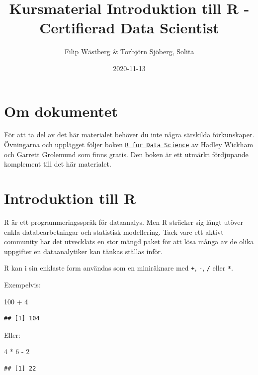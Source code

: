 \documentclass[
]{book}
\title{Kursmaterial Introduktion till R - Certifierad Data Scientist}
\author{Filip Wästberg \& Torbjörn Sjöberg, Solita}
\date{2020-11-13}
\newenvironment{Shaded}{\begin{snugshade}}{\end{snugshade}}
\newcommand{\DecValTok}[1]{\textcolor[rgb]{0.00,0.00,0.81}{#1}}
\newcommand{\SpecialCharTok}[1]{\textcolor[rgb]{0.00,0.00,0.00}{#1}}
\begin{document}
\maketitle

{
\setcounter{tocdepth}{1}
\tableofcontents
}
\hypertarget{om-dokumentet}{%
\chapter{Om dokumentet}\label{om-dokumentet}}

För att ta del av det här materialet behöver du inte några särskilda förkunskaper. Övningarna och upplägget följer boken \href{http://r4ds.had.co.nz/index.html}{\texttt{R\ for\ Data\ Science}} av Hadley Wickham och Garrett Grolemund som finns gratis. Den boken är ett utmärkt fördjupande komplement till det här materialet.

\hypertarget{intro}{%
\chapter{Introduktion till R}\label{intro}}

R är ett programmeringsspråk för dataanalys. Men R sträcker sig långt utöver enkla databearbetningar och statistisk modellering. Tack vare ett aktivt community har det utvecklats en stor mängd paket för att lösa många av de olika uppgifter en dataanalytiker kan tänkas ställas inför.

R kan i sin enklaste form användas som en miniräknare med \texttt{+}, \texttt{-}, \texttt{/} eller \texttt{*}.

Exempelvis:

\begin{Shaded}
\begin{Highlighting}[]
\DecValTok{100} \SpecialCharTok{+} \DecValTok{4}
\end{Highlighting}
\end{Shaded}

\begin{verbatim}
## [1] 104
\end{verbatim}

Eller:

\begin{Shaded}
\begin{Highlighting}[]
\DecValTok{4} \SpecialCharTok{*} \DecValTok{6} \SpecialCharTok{{-}} \DecValTok{2}
\end{Highlighting}
\end{Shaded}

\begin{verbatim}
## [1] 22
\end{verbatim}
\end{document}
